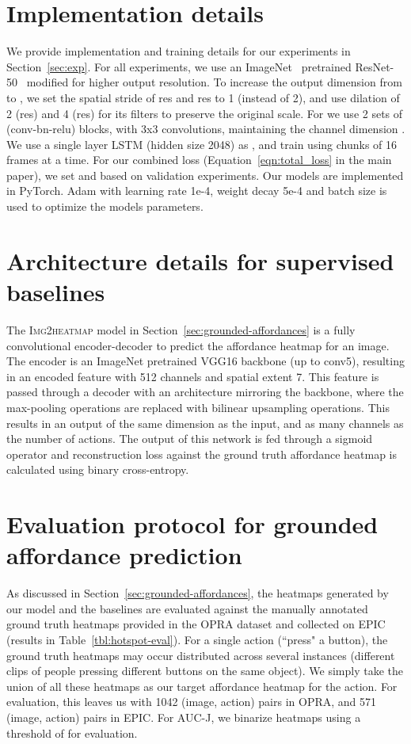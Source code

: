 \documentclass[10pt,twocolumn,letterpaper]{article}
\newcommand{\SC}[1]{{\textsc{#1}}}
\newcommand{\refeqn}[1]{Equation~\ref{#1}}
\newcommand{\reftbl}[1]{Table~\ref{#1}}
\newcommand{\refsec}[1]{Section~\ref{#1}}
\begin{document}
\section{Implementation details} \label{sec:implementation}
We provide implementation and training details for our experiments in  \refsec{sec:exp}. For all experiments, we use an ImageNet~\cite{krizhevsky2012imagenet} pretrained ResNet-50~\cite{he2016deep} modified for higher output resolution. To increase the output dimension from  to , we set the spatial stride of res and res to 1 (instead of 2), and use dilation of 2 (res) and 4 (res) for its filters to preserve the original scale.  For  we use 2 sets of  (conv-bn-relu) blocks, with 3x3 convolutions, maintaining the channel dimension . We use a single layer LSTM (hidden size 2048) as , and train using chunks of 16 frames at a time. For our combined loss (\refeqn{eqn:total_loss} in the main paper), we set  and  based on validation experiments. Our models are implemented in PyTorch. Adam with learning rate 1e-4, weight decay 5e-4 and batch size  is used to optimize the models parameters. 



\section{Architecture details for supervised baselines} \label{sec:img2heatmap}
The \SC{Img2heatmap} model in \refsec{sec:grounded-affordances} is a fully convolutional encoder-decoder to predict the affordance heatmap for an image. The encoder is an ImageNet pretrained VGG16 backbone (up to conv5), resulting in an encoded feature with 512 channels and spatial extent 7. This feature is passed through a decoder with an architecture mirroring the backbone, where the max-pooling operations are replaced with bilinear upsampling operations. This results in an output of the same dimension as the input, and as many channels as the number of actions. The output of this network is fed through a sigmoid operator and reconstruction loss against the ground truth affordance heatmap is calculated using binary cross-entropy.

\section{Evaluation protocol for grounded affordance prediction} \label{sec:evaluation}
As discussed in \refsec{sec:grounded-affordances}, the heatmaps generated by our model and the baselines are evaluated against the manually annotated ground truth heatmaps provided in the OPRA dataset and collected on EPIC (results in \reftbl{tbl:hotspot-eval}). For a single action (\eg ``press" a button), the ground truth heatmaps may occur distributed across several instances (\eg different clips of people pressing different buttons on the same object). We simply take the union of all these heatmaps as our target affordance heatmap for the action. For evaluation, this leaves us with 1042 (image, action) pairs in OPRA, and 571 (image, action) pairs in EPIC. For AUC-J, we binarize heatmaps using a threshold of  for evaluation. 
\end{document}
